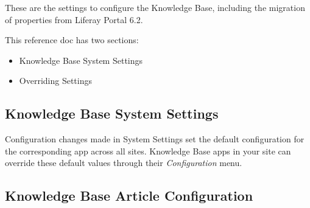 These are the settings to configure the Knowledge Base, including the
migration of properties from Liferay Portal 6.2.

This reference doc has two sections:

\begin{itemize}
\tightlist
\item
  Knowledge Base System Settings
\item
  Overriding Settings
\end{itemize}

\subsection{Knowledge Base System
Settings}\label{knowledge-base-system-settings}

Configuration changes made in System Settings set the default
configuration for the corresponding app across all sites. Knowledge Base
apps in your site can override these default values through their
\emph{Configuration} menu.

\subsection{Knowledge Base Article
Configuration}\label{knowledge-base-article-configuration}

